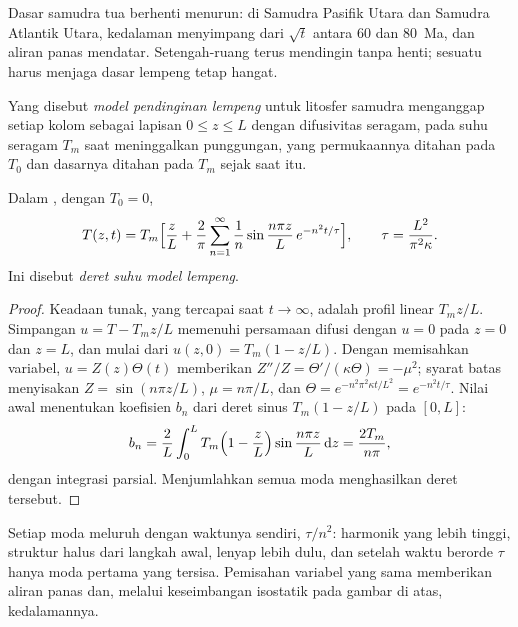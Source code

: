 Dasar samudra tua berhenti menurun: di Samudra Pasifik Utara dan Samudra Atlantik
Utara, kedalaman menyimpang dari $\sqrt t$ antara 60 dan \qty{80}{Ma}, dan aliran
panas mendatar. Setengah-ruang terus mendingin tanpa henti; sesuatu harus menjaga
dasar lempeng tetap hangat.

\begin{definition}\label{def:b3:lithosphere-thermal-models:plate}
Yang disebut \emph{model pendinginan lempeng} untuk
litosfer samudra menganggap setiap kolom sebagai lapisan $0 \le z \le L$ dengan
difusivitas seragam, pada suhu seragam $T_m$ saat meninggalkan punggungan, yang
permukaannya ditahan pada $T_0$ dan dasarnya ditahan pada $T_m$ sejak saat itu.
\end{definition}

\begin{theorem}\label{thm:b3:lithosphere-thermal-models:plate-series}
Dalam , dengan $T_0 = 0$,
\[
  T(z, t) = T_m\Bigl[\frac zL + \frac2\pi\sum_{n=1}^\infty\frac1n
  \sin\frac{n\pi z}{L}\,e^{-n^2t/\tau}\Bigr],\qquad
  \tau = \frac{L^2}{\pi^2\kappa} .
\]
Ini disebut \emph{deret suhu model lempeng}.
\end{theorem}

\begin{proof}
Keadaan tunak, yang tercapai saat $t \to \infty$, adalah profil linear $T_mz/L$.
Simpangan $u = T - T_mz/L$ memenuhi persamaan difusi dengan $u = 0$ pada
$z = 0$ dan $z = L$, dan mulai dari $u(z, 0) = T_m(1 - z/L)$. Dengan memisahkan
variabel, $u = Z(z)\Theta(t)$ memberikan $Z''/Z = \Theta'/(\kappa\Theta) = -\mu^2$;
syarat batas menyisakan $Z = \sin(n\pi z/L)$, $\mu = n\pi/L$, dan
$\Theta = e^{-n^2\pi^2\kappa t/L^2} = e^{-n^2t/\tau}$. Nilai awal menentukan
koefisien $b_n$ dari deret sinus $T_m(1 - z/L)$ pada $[0, L]$:
\[
  b_n = \frac2L\int_0^LT_m\Bigl(1 - \frac zL\Bigr)\sin\frac{n\pi z}{L}\,\mathrm dz
  = \frac{2T_m}{n\pi},
\]
dengan integrasi parsial. Menjumlahkan semua moda menghasilkan deret tersebut.
\end{proof}

Setiap moda meluruh dengan waktunya sendiri, $\tau/n^2$: harmonik yang lebih tinggi, struktur halus dari
langkah awal, lenyap lebih dulu, dan setelah waktu berorde $\tau$
hanya moda pertama yang tersisa. Pemisahan variabel yang sama memberikan aliran panas
dan, melalui keseimbangan isostatik pada gambar di atas, kedalamannya.

